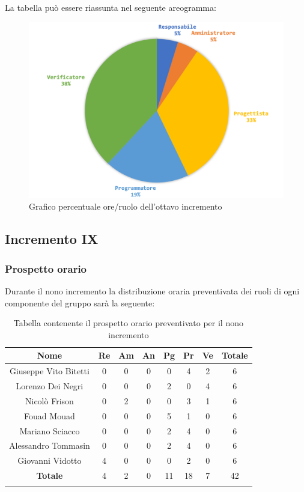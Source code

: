 		La tabella può essere riassunta nel seguente areogramma:
		\begin{figure}[H]
			\centering
			\includegraphics[width=0.8\linewidth]{./images/preventivo/incremento8-2.png}
			\caption{Grafico percentuale ore/ruolo dell'ottavo incremento}
			\label{fig:grafico costi ruolo incremento VIII}
		\end{figure}
		
		
		
	\subsection{Incremento IX}
		\subsubsection{Prospetto orario}
		Durante il nono incremento la distribuzione oraria preventivata dei ruoli di ogni componente del gruppo sarà la seguente:
		
		\begin{longtable}{|c|c|c|c|c|c|c|c|}
			\hline
			\rowcolor{lighter-grayer}
			\textbf{Nome} & \textbf{Re} & \textbf{Am} & \textbf{An} & \textbf{Pg}  & \textbf{Pr}   & \textbf{Ve} & \textbf{Totale} \\
			\hline
			\endfirsthead
			
			\hline
			Giuseppe Vito Bitetti 		 & 0 & 0 & 0 & 0 & 4 & 2 & 6\\
			\hline
			\hline
			Lorenzo Dei Negri			 & 0 & 0 & 0 & 2 & 0 & 4 & 6\\
			\hline
			\hline
			Nicolò Frison				      & 0 & 2 & 0 & 0 & 3 & 1 & 6\\
			\hline
			\hline
			Fouad Mouad 				   & 0 & 0 & 0 & 5 & 1 & 0 & 6\\
			\hline
			\hline
			Mariano Sciacco 			 & 0 & 0 & 0 & 2 & 4 & 0 & 6\\
			\hline
			\hline
			Alessandro Tommasin    & 0 & 0 & 0 & 2 & 4 & 0 & 6\\
			\hline
			\hline
			Giovanni Vidotto 			  & 4 & 0 & 0 & 0 & 2 & 0 & 6\\
			\hline 
			\textbf{Totale}			 		& 4 & 2 & 0 & 11 & 18 & 7 & 42\\
			\hline
			\caption{Tabella contenente il prospetto orario preventivato per il nono incremento}
		\end{longtable}
		\pagebreak
		
